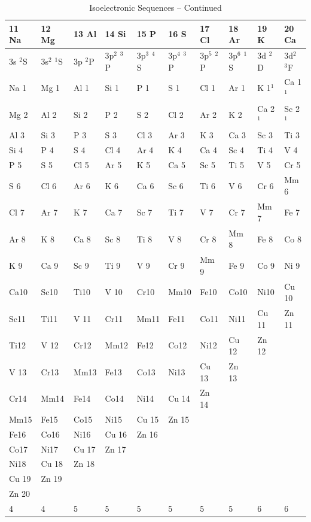 \begin{table}
\begin{center}
\addtocounter{table}{-1}
\caption{Isoelectronic Sequences -- Continued}
\begin{tabular}{llllllllll}
\hline
11 Na&  12 Mg&  13 Al&  14 Si&  15 P&   16 S&   17 Cl&  18 Ar&  19 K&   20
Ca\\
\hline
3s $^2$S& 3s$^2$ $^1$S& 3p $^2$P& 3p$^2$ $^3$P& 3p$^3$ $^4$S& 3p$^4$ $^3$P&
3p$^5$ $^2$P& 3p$^6$ $^1$S& 3d $^2$D& 3d$^2$ $^3$F\\
Na 1& Mg 1& Al 1& Si 1& P
1& S  1& Cl 1& Ar 1& K  1$^1$ & Ca 1$^1$\\
Mg 2& Al 2& Si 2& P  2& S  2& Cl 2& Ar 2& K  2& Ca 2$^1$& Sc 2$^1$\\
Al 3& Si
3& P 3& S  3& Cl 3& Ar 3& K  3& Ca 3& Sc 3& Ti 3\\
Si 4& P 4& S  4& Cl 4& Ar 4& K  4& Ca 4& Sc 4& Ti 4& V 4\\
P 5& S  5& Cl 5& Ar 5& K  5& Ca 5& Sc 5& Ti 5& V  5& Cr 5\\
S  6& Cl 6& Ar 6& K  6& Ca 6& Sc 6& Ti 6& V
6& Cr 6& Mm 6\\
Cl 7& Ar 7& K  7& Ca 7& Sc 7& Ti 7& V  7& Cr 7& Mm 7& Fe 7\\
Ar 8& K  8& Ca 8& Sc 8& Ti 8& V
8& Cr 8& Mm 8& Fe 8& Co 8\\
K  9& Ca 9& Sc 9& Ti 9& V  9& Cr 9& Mm 9& Fe 9& Co 9& Ni 9\\
Ca10& Sc10& Ti10& V
10& Cr10& Mm10& Fe10& Co10& Ni10& Cu 10\\
 Sc11& Ti11& V 11& Cr11& Mm11& Fe11& Co11& Ni11& Cu 11& Zn 11\\
 Ti12& V
12& Cr12& Mm12& Fe12& Co12& Ni12& Cu 12& Zn 12\\
V 13& Cr13& Mm13& Fe13& Co13& Ni13& Cu 13& Zn
13\\
Cr14& Mm14& Fe14& Co14& Ni14& Cu 14& Zn 14\\
 Mm15& Fe15& Co15& Ni15& Cu 15& Zn 15\\
Fe16& Co16& Ni16& Cu
16& Zn 16\\
Co17& Ni17& Cu 17&  Zn 17\\
Ni18& Cu 18&  Zn 18\\
Cu 19& Zn 19\\
Zn 20\\
4& 4&5&5&5&5&5&5&6&6\\
\hline
\end{tabular}
\end{center}
\end{table}


